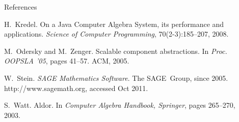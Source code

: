 \documentclass[final]{beamer}
\begin{document}
\begin{frame}[fragile]
\begin{columns}[t]
\begin{column}{.3\linewidth}
\begin{block}{\large References}
\begin{thebibliography}{1}
\def\newblock{}
H.~Kredel.
\newblock On a {Java} {Computer} {Algebra} {System}, its performance and
  applications.
\newblock {\em Science of Computer Programming}, 70(2-3):185--207, 2008.

\def\newblock{}
M.~Odersky and M.~Zenger.
\newblock Scalable component abstractions.
\newblock In {\em Proc. OOPSLA '05}, pages 41--57. ACM, 2005.

\def\newblock{}
W.~Stein.
\newblock {\em {SAGE} {M}athematics {S}oftware}.
\newblock The SAGE~Group, since 2005.
\newblock http://www.sagemath.org, accessed Oct 2011.

\def\newblock{}
S.~Watt.
\newblock Aldor.
\newblock In {\em Computer Algebra Handbook, Springer}, pages 265--270, 2003.

\end{thebibliography}

  \end{block}
\end{column}


\begin{column}{.3\linewidth}


\end{column}
\end{columns}
\end{frame}
\end{document}
